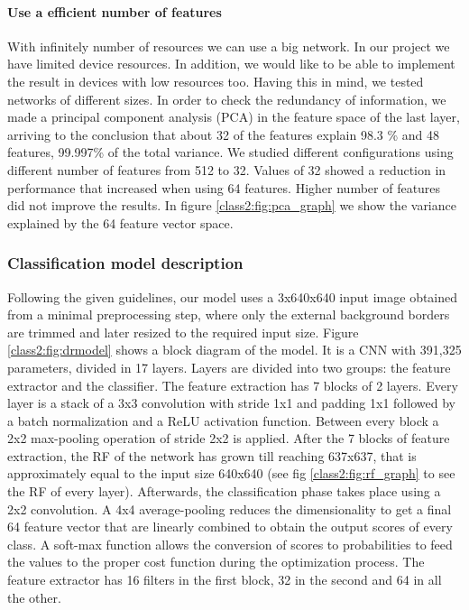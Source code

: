 \paragraph{Use a efficient number of features} With infinitely number of resources we can use a big network. In our project we have limited device resources. In addition, we would like to be able to implement the result in devices with low resources too. Having this in mind, we tested networks of different sizes. In order to check the redundancy of information, we made a principal component analysis (PCA) in the feature space of the last layer, arriving to the conclusion that about 32 of the features explain 98.3 \% and 48 features, 99.997\% of the total variance. We studied different configurations using different number of features from 512 to 32. Values of 32 showed a reduction in performance that increased when using 64 features. Higher number of features did not improve the results. In figure \ref{class2:fig:pca_graph} we show the variance explained by the 64 feature vector space.

\subsubsection{Classification model description}

Following the given guidelines, our model uses a 3x640x640 input image obtained from a minimal preprocessing step, where only the external background borders are trimmed and later resized to the required input size. Figure \ref{class2:fig:drmodel} shows a block diagram of the model. It is a CNN with 391,325 parameters, divided in 17 layers. Layers are divided into two groups: the feature extractor and the classifier. The feature extraction has 7 blocks of 2 layers. Every layer is a stack of a 3x3 convolution with stride 1x1 and padding 1x1 followed by a batch normalization and a ReLU activation function. Between every block a 2x2 max-pooling operation of stride 2x2 is applied. After the 7 blocks of feature extraction, the RF of the network has grown till reaching 637x637, that is approximately equal to the input size 640x640 (see fig \ref{class2:fig:rf_graph} to see the RF of every layer). Afterwards, the classification phase takes place using a 2x2 convolution. A 4x4 average-pooling reduces the dimensionality to get a final 64 feature vector that are linearly combined to obtain the output scores of every class. A soft-max function allows the conversion of scores to probabilities to feed the values to the proper cost function during the optimization process. The feature extractor has 16 filters in the first block, 32 in the second and 64 in all the other.

